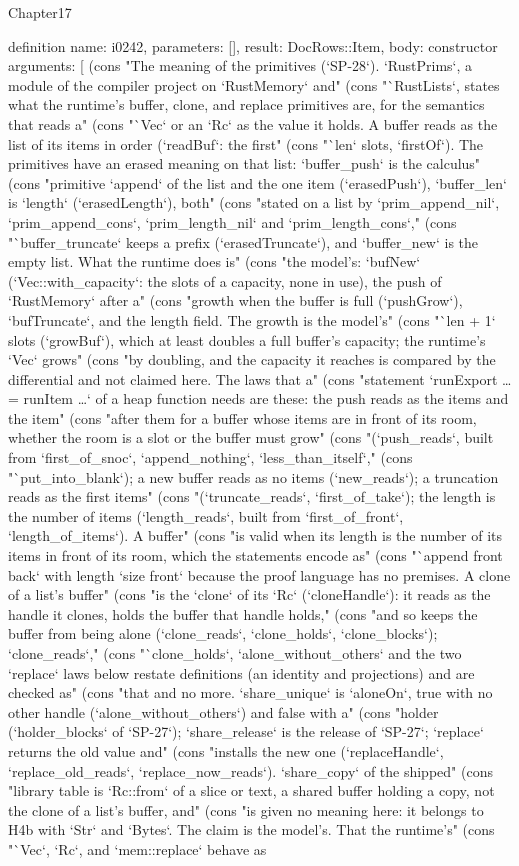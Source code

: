 \begin{lexlean}{Chapter17}
\begin{semanticmodule}
definition{
  name: i0242,
  parameters: [],
  result: DocRows::Item,
  body: constructor{
    arguments: [
      (cons "The meaning of the primitives (`SP-28`). `RustPrims`, a module of the compiler project on `RustMemory` and" (cons "`RustLists`, states what the runtime's buffer, clone, and replace primitives are, for the semantics that reads a" (cons "`Vec` or an `Rc` as the value it holds. A buffer reads as the list of its items in order (`readBuf`: the first" (cons "`len` slots, `firstOf`). The primitives have an erased meaning on that list: `buffer_push` is the calculus" (cons "primitive `append` of the list and the one item (`erasedPush`), `buffer_len` is `length` (`erasedLength`), both" (cons "stated on a list by `prim_append_nil`, `prim_append_cons`, `prim_length_nil` and `prim_length_cons`," (cons "`buffer_truncate` keeps a prefix (`erasedTruncate`), and `buffer_new` is the empty list. What the runtime does is" (cons "the model's: `bufNew` (`Vec::with_capacity`: the slots of a capacity, none in use), the push of `RustMemory` after a" (cons "growth when the buffer is full (`pushGrow`), `bufTruncate`, and the length field. The growth is the model's" (cons "`len + 1` slots (`growBuf`), which at least doubles a full buffer's capacity; the runtime's `Vec` grows" (cons "by doubling, and the capacity it reaches is compared by the differential and not claimed here. The laws that a" (cons "statement `runExport … = runItem …` of a heap function needs are these: the push reads as the items and the item" (cons "after them for a buffer whose items are in front of its room, whether the room is a slot or the buffer must grow" (cons "(`push_reads`, built from `first_of_snoc`, `append_nothing`, `less_than_itself`," (cons "`put_into_blank`); a new buffer reads as no items (`new_reads`); a truncation reads as the first items" (cons "(`truncate_reads`, `first_of_take`); the length is the number of items (`length_reads`, built from `first_of_front`, `length_of_items`). A buffer" (cons "is valid when its length is the number of its items in front of its room, which the statements encode as" (cons "`append front back` with length `size front` because the proof language has no premises. A clone of a list's buffer" (cons "is the `clone` of its `Rc` (`cloneHandle`): it reads as the handle it clones, holds the buffer that handle holds," (cons "and so keeps the buffer from being alone (`clone_reads`, `clone_holds`, `clone_blocks`); `clone_reads`," (cons "`clone_holds`, `alone_without_others` and the two `replace` laws below restate definitions (an identity and projections) and are checked as" (cons "that and no more. `share_unique` is `aloneOn`, true with no other handle (`alone_without_others`) and false with a" (cons "holder (`holder_blocks` of `SP-27`); `share_release` is the release of `SP-27`; `replace` returns the old value and" (cons "installs the new one (`replaceHandle`, `replace_old_reads`, `replace_now_reads`). `share_copy` of the shipped" (cons "library table is `Rc::from` of a slice or text, a shared buffer holding a copy, not the clone of a list's buffer, and" (cons "is given no meaning here: it belongs to H4b with `Str` and `Bytes`. The claim is the model's. That the runtime's" (cons "`Vec`, `Rc`, and `mem::replace` behave as }}
\end{semanticmodule}
\end{lexlean}
